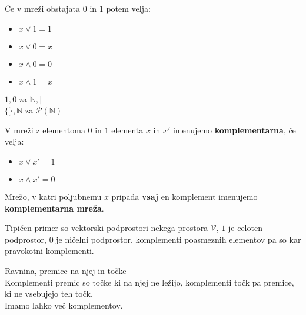 \documentclass[slovene]{beamer}
\begin{document}
\begin{frame}
\begin{block}{}
Če v mreži obstajata $0$ in $1$ potem velja:
\begin{itemize}
\item $x \lor 1 = 1$
\item $x \lor 0 = x$
\item $x \land 0 = 0$
\item $x \land 1 = x$
\end{itemize}
\end{block}

\pause
\begin{example}
$1,0$ za $\mathbb{N}, |$\\ $\{ \}, \mathbb{N}$ za $\mathcal{P}(\mathbb{N})$
\end{example}

\end{frame}

\begin{frame}
\begin{definition}
V mreži z elementoma $0$ in $1$ elementa $x$ in $x'$ imenujemo \textbf{komplementarna}, če velja:
\begin{itemize}
\item $x \lor x' = 1$
\item $x \land x' = 0$
\end{itemize}
\end{definition}

\begin{definition}
Mrežo, v katri poljubnemu $x$ pripada \textbf{vsaj} en komplement imenujemo \textbf{komplementarna mreža}.
\end{definition}

\end{frame}

\begin{frame}
\begin{example}
Tipičen primer so vektorski podprostori nekega prostora $\mathcal{V}$, $1$ je celoten podprostor, $0$ je ničelni podprostor, komplementi poasmeznih elementov pa so kar pravokotni komplementi.
\end{example}

\begin{example}
Ravnina, premice na njej in točke\\
Komplementi premic so točke ki na njej ne ležijo, komplementi točk pa premice, ki ne vsebujejo teh točk.\\
Imamo lahko več komplementov.
\end{example}

\end{frame}
\end{document}

